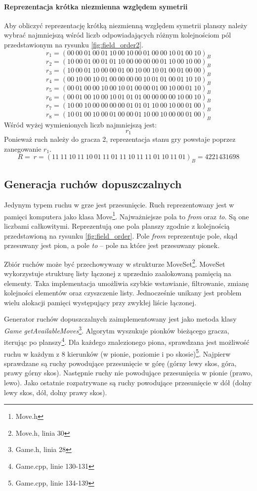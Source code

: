 \documentclass{scrartcl}
\begin{document}
\paragraph{Reprezentacja krótka niezmienna względem symetrii} Aby obliczyć reprezentację krótką niezmienną względem symetrii planszy
należy wybrać najmniejszą wśród liczb odpowiadających różnym 
kolejnościom pól przedstawionym na rysunku \ref{fig:field_order2}.
\[r_1 = (00\ 00\ 01\ 00\ 01\ 10\ 00\ 10\ 00\ 01\ 00\ 00\ 10\ 01\ 00\ 10
)_B \]
\[r_2 = (10\ 00\ 01\ 00\ 01\ 01\ 10\ 00\ 00\ 00\ 00\ 01\ 10\ 00\ 10\ 00
)_B\]
\[r_3 = (10\ 00\ 01\ 10\ 00\ 00\ 01\ 00\ 10\ 00\ 10\ 01\ 00\ 01\ 00\ 00
)_B\]
\[r_4 = (00\ 10\ 00\ 10\ 01\ 00\ 00\ 00\ 00\ 10\ 01\ 01\ 00\ 01\ 10\ 10
)_B\]
\[r_5 = (00\ 01\ 00\ 00\ 10\ 00\ 10\ 01\ 00\ 00\ 01\ 00\ 10\ 00\ 01\ 10
)_B\]
\[r_6 = (00\ 01\ 00\ 10\ 00\ 10\ 01\ 01\ 01\ 00\ 00\ 00\ 00\ 10\ 00\ 10
)_B\]
\[r_7 = (10\ 00\ 10\ 00\ 00\ 00\ 00\ 01\ 01\ 01\ 10\ 00\ 10\ 00\ 01\ 00
)_B\]
\[r_8 = (10\ 01\ 00\ 10\ 00\ 01\ 00\ 00\ 01\ 10\ 00\ 10\ 00\ 00\ 01\ 00
)_B\]
Wśród wyżej wymienionych liczb najmniejszą jest:
\[r_1\]
Ponieważ ruch należy do gracza 2, reprezentacja stanu gry powstaje
poprzez zanegowanie $r_1$.
\[R = ~r = (11\ 11\ 10\ 11\ 10\ 01\ 11\ 01\ 11\ 10\ 11\ 11\ 01\ 10\ 11\ 01)_B
= 4221431698 \]

\subsection{Generacja ruchów dopuszczalnych}

Jedynym typem ruchu w grze jest przesunięcie. 
Ruch reprezentowany jest w pamięci komputera jako klasa Move\footnote{
Move.h}. Najważniejsze pola to \emph{from} oraz \emph{to}. Są one
liczbami
całkowitymi. Reprezentują one pola planszy zgodnie z kolejnością 
przedstawioną na rysunku \ref{fig:field_order}. Pole \emph{from}
reprezentuje pole, skąd przesuwany jest pion, a pole \emph{to}
-- pole na które jest przesuwany pionek.

Zbiór ruchów może być przechowywany w strukturze MoveSet\footnote{
Move.h, linia 30}. MoveSet wykorzystuje strukturę listy łączonej
z uprzednio zaalokowaną pamięcią na elementy. Taka implementacja 
umożliwia szybkie wstawianie, filtrowanie, zmianę kolejności
elementów oraz czyszczenie listy. Jednocześnie unikany jest problem 
wielu alokacji pamięci występujący przy zwykłej liście łączonej.

Generator ruchów dopuszczalnych zaimplementowany jest jako metoda 
klasy \emph{Game} \emph{getAvailableMoves}\footnote{Game.h, linia 28}.
Algorytm wyszukuje pionków bieżącego gracza, iterując po
planszy\footnote{Game.cpp, linie 130-131}. Dla każdego znalezionego
piona, sprawdzana jest możliwość ruchu w każdym z 8 kierunków
(w pionie, poziomie i po skosie)\footnote{Game.cpp, linie 134-139}.
Najpierw sprawdzane są ruchy powodujące przesunięcie w górę 
(górny lewy skos, góra, prawy górny skos). Następnie ruchy nie 
powodujące przesunięcia w pionie (prawo, lewo). Jako ostatnie 
rozpatrywane są ruchy powodujące przesunięcie w dół (dolny lewy
skos, dół, dolny prawy skos).
\end{document}
